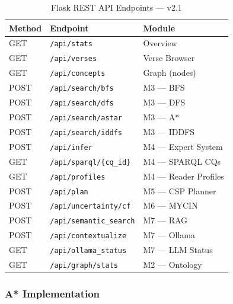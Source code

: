 \documentclass[conference]{IEEEtran}
\begin{document}
\begin{table}[htbp]
\caption{Flask REST API Endpoints — v2.1}
\label{tab:api}
\centering
\begin{tabular}{lp{3.6cm}p{2.4cm}}
\toprule
\textbf{Method} & \textbf{Endpoint} & \textbf{Module} \\
\midrule
GET  & \texttt{/api/stats}               & Overview \\
GET  & \texttt{/api/verses}              & Verse Browser \\
GET  & \texttt{/api/concepts}            & Graph (nodes) \\
POST & \texttt{/api/search/bfs}          & M3 — BFS \\
POST & \texttt{/api/search/dfs}          & M3 — DFS \\
POST & \texttt{/api/search/astar}        & M3 — A* \\
POST & \texttt{/api/search/iddfs}        & M3 — IDDFS \\
POST & \texttt{/api/infer}               & M4 — Expert System \\
GET  & \texttt{/api/sparql/\{cq\_id\}}    & M4 — SPARQL CQs \\
GET  & \texttt{/api/profiles}            & M4 — Reader Profiles \\
POST & \texttt{/api/plan}                & M5 — CSP Planner \\
POST & \texttt{/api/uncertainty/cf}      & M6 — MYCIN \\
POST & \texttt{/api/semantic\_search}    & M7 — RAG \\
POST & \texttt{/api/contextualize}       & M7 — Ollama \\
GET  & \texttt{/api/ollama\_status}      & M7 — LLM Status \\
GET  & \texttt{/api/graph/stats}         & M2 — Ontology \\
\bottomrule
\end{tabular}
\end{table}

\subsubsection{A* Implementation}
\end{document}
